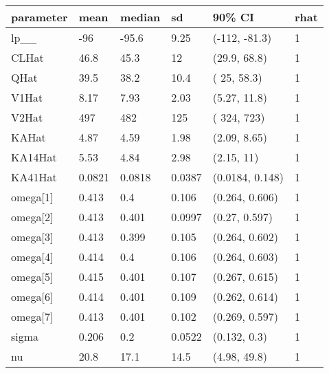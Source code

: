 
\begin{tabular}{l|l|l|l|l|l}
\hline
parameter & mean & median & sd & 90\% CI & rhat\\
\hline
lp\_\_ & -96 & -95.6 & 9.25 & (-112, -81.3) & 1\\
\hline
CLHat & 46.8 & 45.3 & 12 & (29.9, 68.8) & 1\\
\hline
QHat & 39.5 & 38.2 & 10.4 & (  25, 58.3) & 1\\
\hline
V1Hat & 8.17 & 7.93 & 2.03 & (5.27, 11.8) & 1\\
\hline
V2Hat & 497 & 482 & 125 & ( 324,  723) & 1\\
\hline
KAHat & 4.87 & 4.59 & 1.98 & (2.09, 8.65) & 1\\
\hline
KA14Hat & 5.53 & 4.84 & 2.98 & (2.15,   11) & 1\\
\hline
KA41Hat & 0.0821 & 0.0818 & 0.0387 & (0.0184, 0.148) & 1\\
\hline
omega[1] & 0.413 & 0.4 & 0.106 & (0.264, 0.606) & 1\\
\hline
omega[2] & 0.413 & 0.401 & 0.0997 & (0.27, 0.597) & 1\\
\hline
omega[3] & 0.413 & 0.399 & 0.105 & (0.264, 0.602) & 1\\
\hline
omega[4] & 0.414 & 0.4 & 0.106 & (0.264, 0.603) & 1\\
\hline
omega[5] & 0.415 & 0.401 & 0.107 & (0.267, 0.615) & 1\\
\hline
omega[6] & 0.414 & 0.401 & 0.109 & (0.262, 0.614) & 1\\
\hline
omega[7] & 0.413 & 0.401 & 0.102 & (0.269, 0.597) & 1\\
\hline
sigma & 0.206 & 0.2 & 0.0522 & (0.132,  0.3) & 1\\
\hline
nu & 20.8 & 17.1 & 14.5 & (4.98, 49.8) & 1\\
\hline
\end{tabular}
